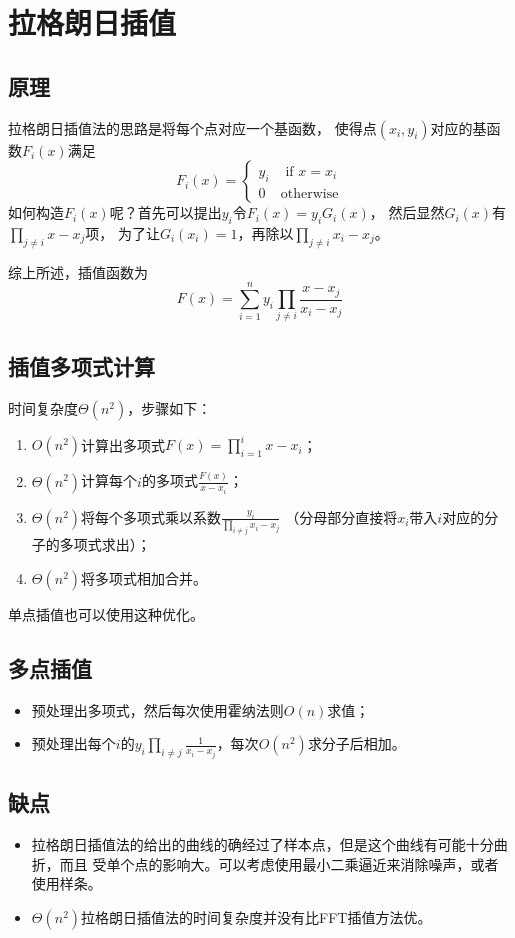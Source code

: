 \section{拉格朗日插值}
\subsection{原理}
拉格朗日插值法的思路是将每个点对应一个基函数，
使得点$(x_i,y_i)$对应的基函数$F_i(x)$满足
\begin{displaymath}
F_i(x)=\left\{\begin{array}{ll}
    y_i& \textrm{~if~$x=x_i$}\\
    0&\textrm{otherwise}
\end{array}\right.
\end{displaymath}
如何构造$F_i(x)$呢？首先可以提出$y_i$令$F_i(x)=y_iG_i(x)$，
然后显然$G_i(x)$有$\displaystyle \prod_{j\neq i}{x-x_j}$项，
为了让$G_i(x_i)=1$，再除以$\displaystyle \prod_{j\neq i}{x_i-x_j}$。

综上所述，插值函数为
\begin{displaymath}
    F(x)=\sum_{i=1}^n{y_i\prod_{j\neq i}{\frac{x-x_j}{x_i-x_j}}}
\end{displaymath}
\subsection{插值多项式计算}
时间复杂度$\Theta(n^2)$，步骤如下：
\begin{enumerate}
    \item $O(n^2)$计算出多项式$\displaystyle F(x)=\prod_{i=1}^i{x-x_i}$；
    \item $\Theta(n^2)$计算每个$i$的多项式$\frac{F(x)}{x-x_i}$；
    \item $\Theta(n^2)$将每个多项式乘以系数$\frac{y_i}{\prod_{i\neq j}{x_i-x_j}}$
    （分母部分直接将$x_i$带入$i$对应的分子的多项式求出）；
    \item $\Theta(n^2)$将多项式相加合并。
\end{enumerate}
单点插值也可以使用这种优化。
\subsection{多点插值}
\begin{itemize}
    \item 预处理出多项式，然后每次使用霍纳法则$O(n)$求值；
    \item 预处理出每个$i$的$\displaystyle y_i
    \prod_{i\neq j}\frac{1}{x_i-x_j}$，每次$O(n^2)$求分子后相加。
\end{itemize}
\subsection{缺点}
\begin{itemize}
    \item 拉格朗日插值法的给出的曲线的确经过了样本点，但是这个曲线有可能十分曲折，而且
    受单个点的影响大。可以考虑使用最小二乘逼近来消除噪声，或者使用样条。
    \item $\Theta(n^2)$拉格朗日插值法的时间复杂度并没有比FFT插值方法优。
\end{itemize}
